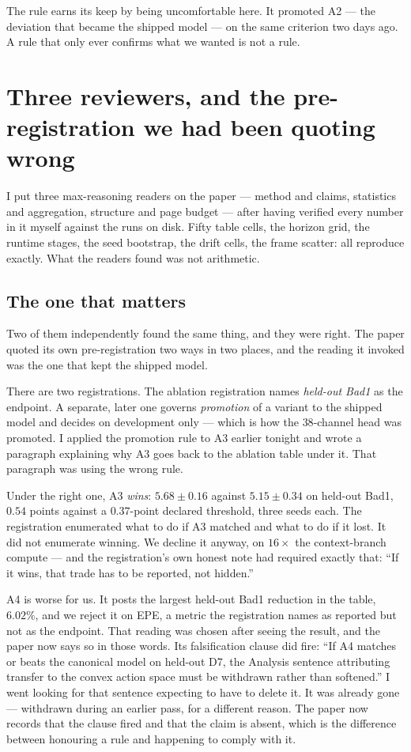 \documentclass[11pt,a4paper]{article}
\begin{document}
The rule earns its keep by being uncomfortable here. It promoted A2 --- the deviation
that became the shipped model --- on the same criterion two days ago. A rule that only
ever confirms what we wanted is not a rule.


\section*{Three reviewers, and the pre-registration we had been quoting wrong}

I put three max-reasoning readers on the paper --- method and claims, statistics
and aggregation, structure and page budget --- after having verified every number
in it myself against the runs on disk. Fifty table cells, the horizon grid, the
runtime stages, the seed bootstrap, the drift cells, the frame scatter: all
reproduce exactly. What the readers found was not arithmetic.

\subsection*{The one that matters}

Two of them independently found the same thing, and they were right. The paper
quoted its own pre-registration two ways in two places, and the reading it
invoked was the one that kept the shipped model.

There are two registrations. The ablation registration names \emph{held-out
Bad1} as the endpoint. A separate, later one governs \emph{promotion} of a
variant to the shipped model and decides on development only --- which is how
the $38$-channel head was promoted. I applied the promotion rule to A3 earlier
tonight and wrote a paragraph explaining why A3 goes back to the ablation table
under it. That paragraph was using the wrong rule.

Under the right one, A3 \emph{wins}: $5.68\pm0.16$ against $5.15\pm0.34$ on
held-out Bad1, $0.54$ points against a $0.37$-point declared threshold, three
seeds each. The registration enumerated what to do if A3 matched and what to do
if it lost. It did not enumerate winning. We decline it anyway, on $16\times$
the context-branch compute --- and the registration's own honest note had
required exactly that: ``If it wins, that trade has to be reported, not
hidden.''

A4 is worse for us. It posts the largest held-out Bad1 reduction in the table,
$6.02\%$, and we reject it on EPE, a metric the registration names as reported
but not as the endpoint. That reading was chosen after seeing the result, and
the paper now says so in those words. Its falsification clause did fire: ``If
A4 matches or beats the canonical model on held-out D7, the Analysis sentence
attributing transfer to the convex action space must be withdrawn rather than
softened.'' I went looking for that sentence expecting to have to delete it.
It was already gone --- withdrawn during an earlier pass, for a different
reason. The paper now records that the clause fired and that the claim is
absent, which is the difference between honouring a rule and happening to
comply with it.
\end{document}
